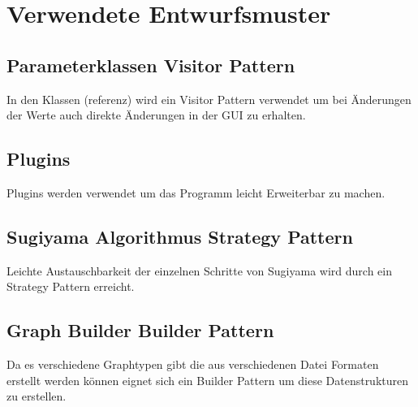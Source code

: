 \chapter{Verwendete Entwurfsmuster}
\label{ch:entwurfsmuster}

\section{Parameterklassen Visitor Pattern}
In den Klassen (referenz) wird ein Visitor Pattern verwendet um bei Änderungen der Werte auch direkte Änderungen in der GUI zu erhalten. %

\section{Plugins}
Plugins werden verwendet um das Programm leicht Erweiterbar zu machen.

\section{Sugiyama Algorithmus Strategy Pattern}
Leichte Austauschbarkeit der einzelnen Schritte von Sugiyama wird durch ein Strategy Pattern erreicht.

\section{Graph Builder Builder Pattern}
Da es verschiedene Graphtypen gibt die aus verschiedenen Datei Formaten erstellt werden können eignet sich ein Builder Pattern um diese Datenstrukturen zu erstellen.